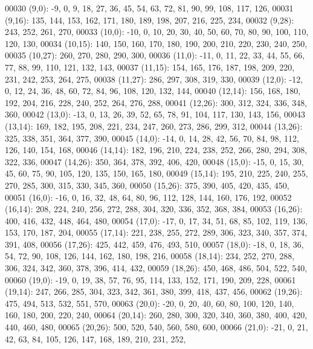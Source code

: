 \begin{DoxyCode}
00030       (9,0): -9, 0, 9, 18, 27, 36, 45, 54, 63, 72, 81, 90, 99, 108, 117, 126,
00031       (9,16): 135, 144, 153, 162, 171, 180, 189, 198, 207, 216, 225, 234,
00032       (9,28): 243, 252, 261, 270,
00033       (10,0): -10, 0, 10, 20, 30, 40, 50, 60, 70, 80, 90, 100, 110, 120, 130,
00034       (10,15): 140, 150, 160, 170, 180, 190, 200, 210, 220, 230, 240, 250,
00035       (10,27): 260, 270, 280, 290, 300,
00036       (11,0): -11, 0, 11, 22, 33, 44, 55, 66, 77, 88, 99, 110, 121, 132, 143,
00037       (11,15): 154, 165, 176, 187, 198, 209, 220, 231, 242, 253, 264, 275,
00038       (11,27): 286, 297, 308, 319, 330,
00039       (12,0): -12, 0, 12, 24, 36, 48, 60, 72, 84, 96, 108, 120, 132, 144,
00040       (12,14): 156, 168, 180, 192, 204, 216, 228, 240, 252, 264, 276, 288,
00041       (12,26): 300, 312, 324, 336, 348, 360,
00042       (13,0): -13, 0, 13, 26, 39, 52, 65, 78, 91, 104, 117, 130, 143, 156,
00043       (13,14): 169, 182, 195, 208, 221, 234, 247, 260, 273, 286, 299, 312,
00044       (13,26): 325, 338, 351, 364, 377, 390,
00045       (14,0): -14, 0, 14, 28, 42, 56, 70, 84, 98, 112, 126, 140, 154, 168,
00046       (14,14): 182, 196, 210, 224, 238, 252, 266, 280, 294, 308, 322, 336,
00047       (14,26): 350, 364, 378, 392, 406, 420,
00048       (15,0): -15, 0, 15, 30, 45, 60, 75, 90, 105, 120, 135, 150, 165, 180,
00049       (15,14): 195, 210, 225, 240, 255, 270, 285, 300, 315, 330, 345, 360,
00050       (15,26): 375, 390, 405, 420, 435, 450,
00051       (16,0): -16, 0, 16, 32, 48, 64, 80, 96, 112, 128, 144, 160, 176, 192,
00052       (16,14): 208, 224, 240, 256, 272, 288, 304, 320, 336, 352, 368, 384,
00053       (16,26): 400, 416, 432, 448, 464, 480,
00054       (17,0): -17, 0, 17, 34, 51, 68, 85, 102, 119, 136, 153, 170, 187, 204,
00055       (17,14): 221, 238, 255, 272, 289, 306, 323, 340, 357, 374, 391, 408,
00056       (17,26): 425, 442, 459, 476, 493, 510,
00057       (18,0): -18, 0, 18, 36, 54, 72, 90, 108, 126, 144, 162, 180, 198, 216,
00058       (18,14): 234, 252, 270, 288, 306, 324, 342, 360, 378, 396, 414, 432,
00059       (18,26): 450, 468, 486, 504, 522, 540,
00060       (19,0): -19, 0, 19, 38, 57, 76, 95, 114, 133, 152, 171, 190, 209, 228,
00061       (19,14): 247, 266, 285, 304, 323, 342, 361, 380, 399, 418, 437, 456,
00062       (19,26): 475, 494, 513, 532, 551, 570,
00063       (20,0): -20, 0, 20, 40, 60, 80, 100, 120, 140, 160, 180, 200, 220, 240,
00064       (20,14): 260, 280, 300, 320, 340, 360, 380, 400, 420, 440, 460, 480,
00065       (20,26): 500, 520, 540, 560, 580, 600,
00066       (21,0): -21, 0, 21, 42, 63, 84, 105, 126, 147, 168, 189, 210, 231, 252,

\end{DoxyCode}
